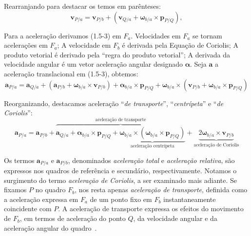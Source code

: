 Rearranjando para destacar os temos em parênteses\footnotemark{}:
\begin{equation*}
    \mathbf{v}_{P/a} = \mathbf{v}_{P/b} + \left( \mathbf{v}_{Q/a} + \mathbf{\omega}_{b/a}\!\times\!\mathbf{p}_{P/Q} \right),
\end{equation*}

Para a aceleração derivamos (1.5-3) em \(F_{a}\). Velocidades em \(F_{a}\) se tornam acelerações em \(F_{a}\); A velocidade em \(F_{b}\) é derivada pela Equação de Coriolis; A produto vetorial é derivado pela ``regra do produto vetorial''\footnotemark{}; A derivada da velocidade angular é um vetor aceleração angular designado \(\mathbf{\alpha}\). Seja \(\mathbf{a}\) a aceleração translacional em (1.5-3), obtemos:
\begin{equation*}
    \mathbf{a}_{P/a} = \mathbf{a}_{Q/a} + \left(\mathbf{a}_{P/b} + \mathbf{\omega}_{b/a}\!\times\!\mathbf{v}_{P/b}\right) + {{\mathbf{\alpha}_{b/a}}\!\times\!{\mathbf{p}_{P/Q}}} + {\mathbf{\omega}_{b/a}}\!\times\!{\left({\mathbf{v}_{P/b}} + {{\mathbf{\omega}_{b/a}}\!\times\!{\mathbf{p}_{P/Q}}}\right)}
\end{equation*}

Reorganizando, destacamos aceleração ``\emph{de transporte}'', ``\emph{centrípeta}'' e ``\emph{de Coriolis}'':
\begin{equation*}
    \mathbf{a}_{P/a} = \mathbf{a}_{P/b} + \overbrace{\mathbf{a}_{Q/a} + {{\mathbf{\alpha}_{b/a}}\!\times\!{\mathbf{p}_{P/Q}}} + \underbrace{{{\mathbf{\omega}_{b/a}}\!\times\!{\left({\mathbf{\omega}_{b/a}}\!\times\!{\mathbf{p}_{P/Q}}\right)}}}_{\text{aceleração centrípeta}}}^{\text{aceleração de transporte}} + \underbrace{{2\mathbf{\omega}_{b/a}\!\times\!\mathbf{v}_{P/b}}}_{\text{aceleração de Coriolis}} \tag{1.5-4}
\end{equation*}


Os termos \(\mathbf{a}_{P/a}\) e \(\mathbf{a}_{P/b}\), denominados \emph{aceleração total} e \emph{aceleração relativa}, são expressos nos quadros de referência e secundário, respectivamente. Notamos o surgimento do termo \textit{aceleração de Coriolis}, a ser examinado mais adiante. Se fixamos \(P\) no quadro \(F_{b}\), nos resta apenas \textit{aceleração de  transporte}, definida como a aceleração expressa em \(F_{a}\) de um ponto fixo em \(F_{b}\) instantaneamente coincidente com \(P\). A aceleração de transporte expressa os efeitos do movimento de \(F_{b}\), em termos de aceleração do ponto \(Q\), da velocidade angular e da aceleração angular do quadro~\cite{Stevens2016}.


